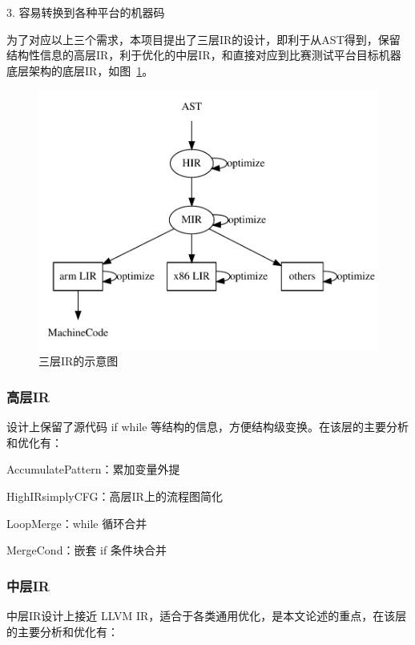 3. 容易转换到各种平台的机器码

为了对应以上三个需求，本项目提出了三层IR的设计，即利于从AST得到，保留结构性信息的高层IR，利于优化的中层IR，和直接对应到比赛测试平台目标机器底层架构的底层IR，如图~\ref{fig:threeIR}。

\begin{figure}[htb]
  \centering
  \includegraphics[width=1.0\textwidth]{figures/three_layer_IR.dot.pdf}
  \caption{三层IR的示意图}
  \label{fig:threeIR}
\end{figure}

\subsubsection{高层IR}

设计上保留了源代码 if while 等结构的信息，方便结构级变换。在该层的主要分析和优化有：


AccumulatePattern：累加变量外提

HighIRsimplyCFG：高层IR上的流程图简化

LoopMerge：while 循环合并

MergeCond：嵌套 if 条件块合并

\subsubsection{中层IR}
中层IR设计上接近 LLVM IR，适合于各类通用优化，是本文论述的重点，在该层的主要分析和优化有：

